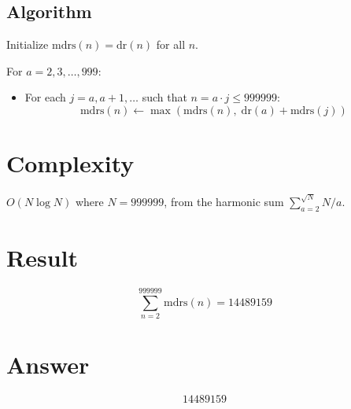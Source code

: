 \documentclass[12pt,a4paper]{article}
\theoremstyle{definition}
\begin{document}
\subsection{Algorithm}

Initialize $\mathrm{mdrs}(n) = \mathrm{dr}(n)$ for all $n$.

For $a = 2, 3, \ldots, 999$:
\begin{itemize}
    \item For each $j = a, a+1, \ldots$ such that $n = a \cdot j \le 999999$:
    \[
    \mathrm{mdrs}(n) \leftarrow \max(\mathrm{mdrs}(n),\; \mathrm{dr}(a) + \mathrm{mdrs}(j))
    \]
\end{itemize}

\section{Complexity}

$O(N \log N)$ where $N = 999999$, from the harmonic sum $\sum_{a=2}^{\sqrt{N}} N/a$.

\section{Result}

\[
\sum_{n=2}^{999999} \mathrm{mdrs}(n) = \boxed{14489159}
\]

\section{Answer}

\[
\boxed{14489159}
\]
\end{document}
